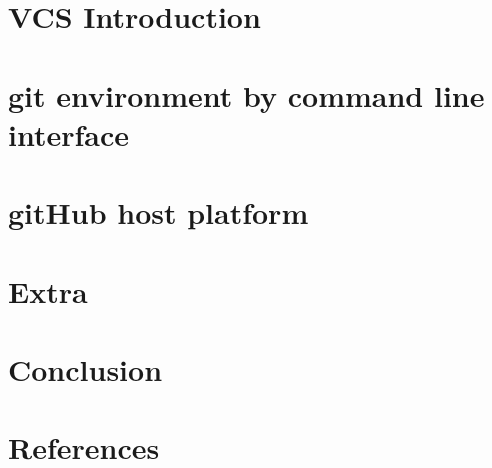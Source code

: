\documentclass{beamer}
\begin{document}
\section{VCS Introduction}


\section{git environment by command line interface}


\section{gitHub host platform}
%

\section{Extra}
%

\section{Conclusion}
%

\section{References}

\end{document}
